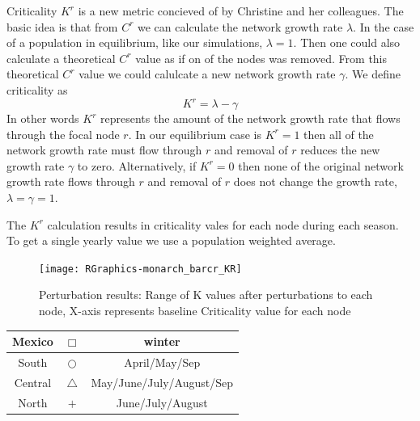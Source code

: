 \documentclass[10pt]{article}
\begin{document}
Criticality $K^r$ is a new metric concieved of by Christine and her colleagues. The basic idea is that from $C^r$ we can calculate the network growth rate $\lambda$. In the case of a population in equilibrium, like our simulations, $\lambda = 1$. Then one could also calculate a theoretical $C^r$ value as if on of the nodes was removed. From this theoretical $C^r$ value we could calulcate a new network growth rate $\gamma$. We define criticality as 
\[K^r = \lambda - \gamma \]
In other words $K^r$ represents the amount of the network growth rate that flows through the focal node $r$. In our equilibrium case is $K^r=1$ then all of the network growth rate must flow through $r$ and removal of $r$ reduces the new growth rate $\gamma$ to zero. Alternatively, if $K^r=0$ then none of the original network growth rate flows through $r$ and removal of $r$ does not change the growth rate, $\lambda=\gamma=1$.

The $K^r$ calculation results in criticality vales for each node during each season. To get a single yearly value we use a population weighted average.



\vspace{-.5cm}
\begin{figure}[H]
\begin{center}
\texttt{[image: RGraphics-monarch\_barcr\_KR]}
\caption{Perturbation results: Range of K values after perturbations to each node, X-axis represents baseline Criticality value for each node}\label{fig:monarch_barcr_KR}
\end{center}
\end{figure}

\vspace{-.5cm}
\begin{tabular}{|c|c|c|}
\hline
{\color{red} Mexico} & $\Box$ & winter \\
\hline
{\color{orange} South} & $\bigcirc$ & April/May/Sep \\
\hline
{\color{blue} Central} & $\triangle$ &  May/June/July/August/Sep \\
\hline
{\color{green} North} & $+$ & June/July/August \\
\hline
\end{tabular}
\end{document}
